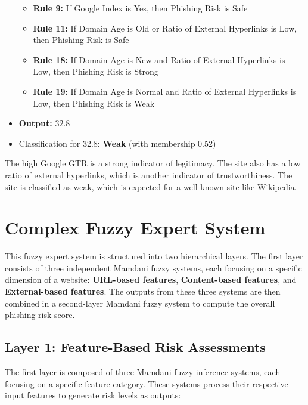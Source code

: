 \documentclass[11pt]{article}
\begin{document}
\begin{itemize}
\begin{itemize}
        \item \textbf{Rule 9:} If Google Index is Yes, then Phishing Risk is Safe
        \item \textbf{Rule 11:} If Domain Age is Old or Ratio of External Hyperlinks is Low, then Phishing Risk is Safe
        \item \textbf{Rule 18:} If Domain Age is New and Ratio of External Hyperlinks is Low, then Phishing Risk is Strong
        \item \textbf{Rule 19:} If Domain Age is Normal and Ratio of External Hyperlinks is Low, then Phishing Risk is Weak
    \end{itemize}
    \item \textbf{Output:} $32.8$
    \item Classification for 32.8: \textbf{Weak} (with membership 0.52)
\end{itemize}

The high Google GTR is a strong indicator of legitimacy. The site also has a low ratio of external hyperlinks, which is another indicator of trustworthiness. The site is classified as weak, which is expected for a well-known site like Wikipedia.

\section{Complex Fuzzy Expert System}

This fuzzy expert system is structured into two hierarchical layers. The first layer consists of three independent Mamdani fuzzy systems, each focusing on a specific dimension of a website: \textbf{URL-based features}, \textbf{Content-based features}, and \textbf{External-based features}. The outputs from these three systems are then combined in a second-layer Mamdani fuzzy system to compute the overall phishing risk score.

\subsection{Layer 1: Feature-Based Risk Assessments}

The first layer is composed of three Mamdani fuzzy inference systems, each focusing on a specific feature category. These systems process their respective input features to generate risk levels as outputs:
\end{document}
